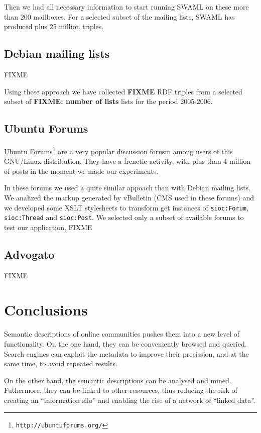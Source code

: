 \documentclass{../templates/www2008-submission}
\begin{document}
Then we had all necessary information to start running SWAML on these 
more than 200 mailboxes. For a selected subset of the mailing lists, 
SWAML has produced plus 25 million triples.

\subsection{Debian mailing lists}

FIXME

Using these approach we have collected \textbf{FIXME} RDF triples
from a selected subset of \textbf{FIXME: number of lists} lists for
the period 2005-2006.

\subsection{Ubuntu Forums}

Ubuntu Forums\footnote{\texttt{http://ubuntuforums.org/}} are a very popular 
discussion forusm among users of this GNU/Linux distribution. They have a 
frenetic activity, with plus than 4 million of posts in the moment we made
our experiments.

In these forums we used a quite similar appoach than with Debian mailing
lists. We analized the markup generated by vBulletin (CMS used in these forums)
and we developed some XSLT stylesheets to transform get instances of
\texttt{sioc:Forum}, \texttt{sioc:Thread} and \texttt{sioc:Post}. We 
selected only a subset of available forums to test our application, FIXME

\subsection{Advogato}

FIXME


\section{\label{sec:conclusions}Conclusions}

Semantic descriptions of online communities pushes them
into a new level of functionality. On the one hand, they can be
conveniently browsed and queried. Search engines can exploit the
metadata to improve their precission, and at the same time, to
avoid repeated results.

On the other hand, the semantic descriptions can be
analysed and mined. Futhermore, they can be linked to other resources,
thus reducing the risk of creating an ``information silo'' and
enabling the rise of a network of ``linked data''.
\end{document}
